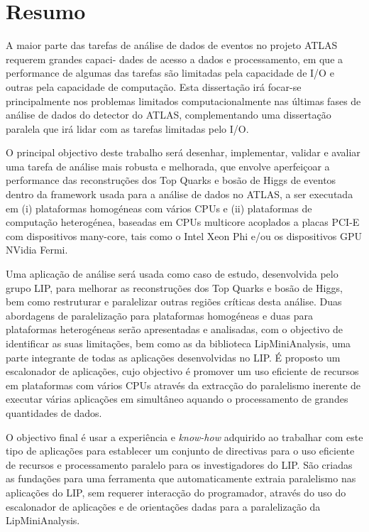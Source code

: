 \chapter*{Resumo}
\label{Resumo}

A maior parte das tarefas de análise de dados de eventos no projeto ATLAS requerem grandes capaci- dades de acesso a dados e processamento, em que a performance de algumas das tarefas são limitadas pela capacidade de I/O e outras pela capacidade de computação. Esta dissertação irá focar-se principalmente nos problemas limitados computacionalmente nas últimas fases de análise de dados do detector do ATLAS, complementando uma dissertação paralela que irá lidar com as tarefas limitadas pelo I/O.

O principal objectivo deste trabalho será desenhar, implementar, validar e avaliar uma tarefa de análise mais robusta e melhorada, que envolve aperfeiçoar a performance das reconstruções dos Top Quarks e bosão de Higgs de eventos dentro da framework usada para a análise de dados no ATLAS, a ser executada em (i) plataformas homogéneas com vários CPUs e (ii) plataformas de computação heterogénea, baseadas em CPUs multicore acoplados a placas PCI-E com dispositivos many-core, tais como o Intel Xeon Phi e/ou os dispositivos GPU NVidia Fermi.

Uma aplicação de análise será usada como caso de estudo, desenvolvida pelo grupo LIP, para melhorar as reconstruções dos Top Quarks e bosão de Higgs, bem como restruturar e paralelizar outras regiões críticas desta análise. Duas abordagens de paralelização para plataformas homogéneas e duas para plataformas heterogéneas serão apresentadas e analisadas, com o objectivo de identificar as suas limitações, bem como as da biblioteca LipMiniAnalysis, uma parte integrante de todas as aplicações desenvolvidas no LIP. É proposto um escalonador de aplicações, cujo objectivo é promover um uso eficiente de recursos em plataformas com vários CPUs através da extracção do paralelismo inerente de executar várias aplicações em simultâneo aquando o processamento de grandes quantidades de dados.

O objectivo final é usar a experiência e \textit{know-how} adquirido ao trabalhar com este tipo de aplicações para establecer um conjunto de directivas para o uso eficiente de recursos e processamento paralelo para os investigadores do LIP. São criadas as fundações para uma ferramenta que automaticamente extraia paralelismo nas aplicações do LIP, sem requerer interacção do programador, através do uso do escalonador de aplicações e de orientações dadas para a paralelização da LipMiniAnalysis.